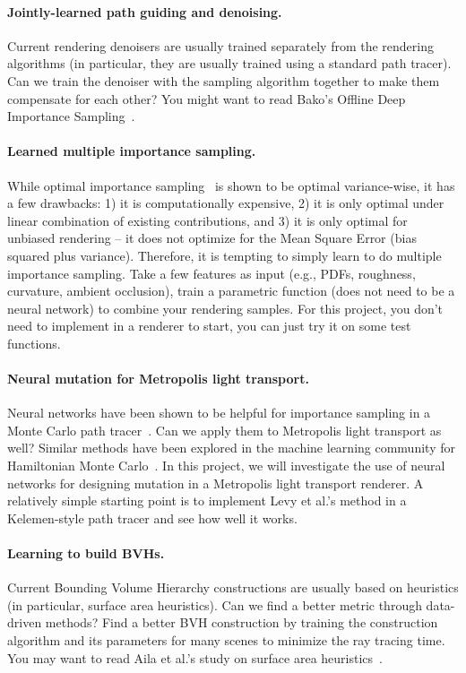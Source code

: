 \paragraph{Jointly-learned path guiding and denoising.}
Current rendering denoisers are usually trained separately from the rendering algorithms (in particular, they are usually trained using a standard path tracer). Can we train the denoiser with the sampling algorithm together to make them compensate for each other? You might want to read Bako's Offline Deep Importance Sampling~\cite{Bako:ODI:2019}.

\paragraph{Learned multiple importance sampling.}
While optimal importance sampling~\cite{Kondapaneni:2019:OMI} is shown to be optimal variance-wise, it has a few drawbacks: 1) it is computationally expensive, 2) it is only optimal under linear combination of existing contributions, and 3) it is only optimal for unbiased rendering -- it does not optimize for the Mean Square Error (bias squared plus variance). Therefore, it is tempting to simply learn to do multiple importance sampling. Take a few features as input (e.g., PDFs, roughness, curvature, ambient occlusion), train a parametric function (does not need to be a neural network) to combine your rendering samples. For this project, you don't need to implement in a renderer to start, you can just try it on some test functions.

\paragraph{Neural mutation for Metropolis light transport.}
Neural networks have been shown to be helpful for importance sampling in a Monte Carlo path tracer~\cite{Muller:2019:NIS}.
Can we apply them to Metropolis light transport as well?
Similar methods have been explored in the machine learning community for Hamiltonian Monte Carlo~\cite{Levy:2018:GHM}.
In this project, we will investigate the use of neural networks for designing mutation in a Metropolis light transport renderer.
A relatively simple starting point is to implement Levy et al.'s method in a Kelemen-style path tracer and see how well it works. 

\paragraph{Learning to build BVHs.}
Current Bounding Volume Hierarchy constructions are usually based on heuristics (in particular, surface area heuristics). Can we find a better metric through data-driven methods? Find a better BVH construction by training the construction algorithm and its parameters for many scenes to minimize the ray tracing time. You may want to read Aila et al.'s study on surface area heuristics~\cite{Aila:2013:QMB}.

